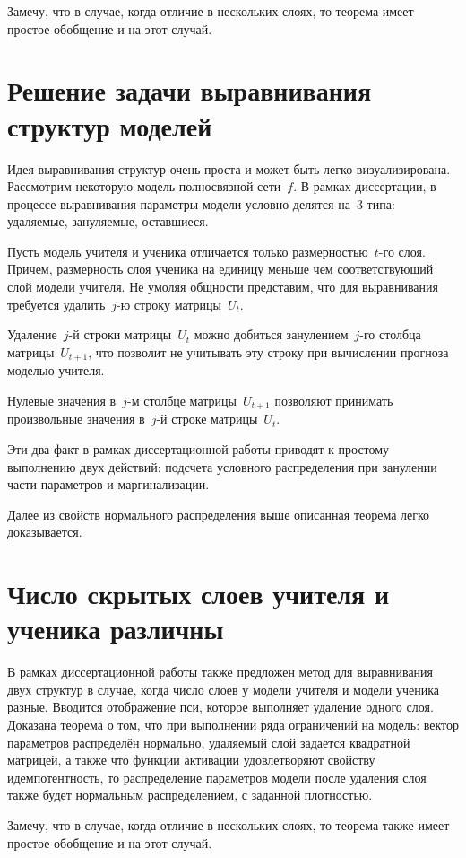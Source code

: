 \documentclass[10pt, twoside]{article}
\begin{document}
Замечу, что в случае, когда отличие в нескольких слоях, то теорема имеет простое обобщение и на этот случай.

\section{Решение задачи выравнивания структур моделей}

Идея выравнивания структур очень проста и может быть легко визуализирована. Рассмотрим некоторую модель полносвязной сети~$f$. В рамках диссертации, в процессе выравнивания параметры модели условно делятся на~$3$ типа: удаляемые, зануляемые, оставшиеся.

Пусть модель учителя и ученика отличается только размерностью~$t$-го слоя. Причем, размерность слоя ученика на единицу меньше чем соответствующий слой модели учителя. Не умоляя общности представим, что для выравнивания требуется удалить~$j$-ю строку матрицы~$U_t$.

Удаление~$j$-й строки матрицы~$U_t$ можно добиться занулением~$j$-го столбца матрицы~$U_{t+1}$, что позволит не учитывать эту строку при вычислении прогноза моделью учителя.

Нулевые значения в~$j$-м столбце матрицы~$U_{t+1}$ позволяют принимать произвольные значения в~$j$-й строке матрицы~$U_{t}$.

Эти два факт в рамках диссертационной работы приводят к простому выполнению двух действий: подсчета условного распределения при занулении части параметров и маргинализации.

Далее из свойств нормального распределения выше описанная теорема легко доказывается.

\section{Число скрытых слоев учителя и ученика различны}
В рамках диссертационной работы также предложен метод для выравнивания двух структур в случае, когда число слоев у модели учителя и модели ученика разные.
Вводится отображение пси, которое выполняет удаление одного слоя.
Доказана теорема о том, что при выполнении ряда ограничений на модель: вектор параметров распределён нормально, удаляемый слой задается квадратной матрицей, а также что функции активации удовлетворяют свойству идемпотентность, то распределение параметров модели после удаления слоя также будет нормальным распределением, с заданной плотностью.

Замечу, что в случае, когда отличие в нескольких слоях, то теорема также имеет простое обобщение и на этот случай.
\end{document}
